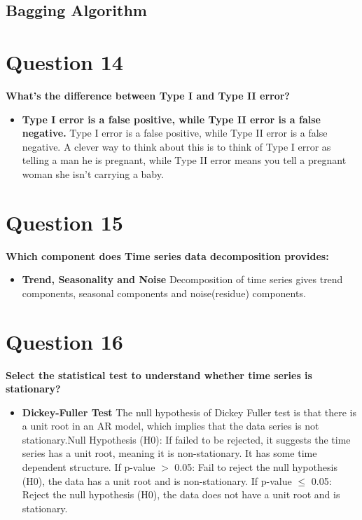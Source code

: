 \documentclass[10pt,letterpaper]{article}
\begin{document}
\subsection{Bagging Algorithm}


\section{Question 14}
\textbf{What’s the difference between Type I and Type II error?}
\begin{itemize}
\item \textbf{Type I error is a false positive, while Type II error is a false negative.} Type I error is a false positive, while Type II error is a false negative. A clever way to think about this is to think of Type I error as telling a man he is pregnant, while Type II error means you tell a pregnant woman she isn’t carrying a baby.
\end{itemize}


\section{Question 15}
\textbf{Which component does Time series data decomposition provides:}
\begin{itemize}
\item \textbf{Trend, Seasonality and Noise} Decomposition of time series gives trend components, seasonal components and noise(residue) components.
\end{itemize}


\section{Question 16}
\textbf{Select the statistical test to understand whether time series is stationary?}
\begin{itemize}
\item \textbf{Dickey-Fuller Test} The null hypothesis of Dickey Fuller test is that there is a unit root in an AR model, which implies that the data series is not stationary.Null Hypothesis (H0): If failed to be rejected, it suggests the time series has a unit root, meaning it is non-stationary. It has some time dependent structure. If p-value $>$ 0.05: Fail to reject the null hypothesis (H0), the data has a unit root and is non-stationary. If p-value $\le$ 0.05: Reject the null hypothesis (H0), the data does not have a unit root and is stationary.
\end{itemize}
\end{document}

